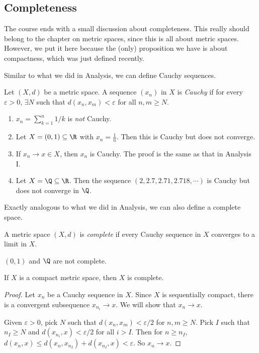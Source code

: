 \documentclass[a4paper]{article}
\begin{document}
\subsection{Completeness}
The course ends with a small discussion about completeness. This really should belong to the chapter on metric spaces, since this is all about metric spaces. However, we put it here because the (only) proposition we have is about compactness, which was just defined recently.

Similar to what we did in Analysis, we can define Cauchy sequences.
\begin{defi}
  Let $(X, d)$ be a metric space. A sequence $(x_n)$ in $X$ is \emph{Cauchy} if for every $\varepsilon > 0$, $\exists N$ such that $d(x_n, x_m) < \varepsilon$ for all $n, m \geq N$.
\end{defi}

\begin{eg}\leavevmode
  \begin{enumerate}
    \item $x_n = \sum_{k = 1}^n 1/k$ is \emph{not} Cauchy.
    \item Let $X = (0, 1) \subseteq \R$ with $x_n = \frac{1}{n}$. Then this is Cauchy but does not converge.
    \item If $x_n \to x\in X$, then $x_n$ is Cauchy. The proof is the same as that in Analysis I.

    \item Let $X = \Q \subseteq \R$. Then the sequence $(2, 2.7, 2.71, 2.718, \cdots)$ is Cauchy but does not converge in $\Q$.
  \end{enumerate}
\end{eg}

Exactly analogous to what we did in Analysis, we can also define a complete space.
\begin{defi}
  A metric space $(X, d)$ is \emph{complete} if every Cauchy sequence in $X$ converges to a limit in $X$.
\end{defi}

\begin{eg}
  $(0, 1)$ and $\Q$ are not complete.
\end{eg}

\begin{prop}
  If $X$ is a compact metric space, then $X$ is complete.
\end{prop}

\begin{proof}
  Let $x_n$ be a Cauchy sequence in $X$. Since $X$ is sequentially compact, there is a convergent subsequence $x_{n_i}\to x$. We will show that $x_n \to x$.

  Given $\varepsilon > 0$, pick $N$ such that $d(x_n, x_m) < \varepsilon/2$ for $n,m \geq N$. Pick $I$ such that $n_I \geq N$ and $d(x_{n_i}, x) < \varepsilon/2$ for all $i> I$. Then for $n \geq n_I$, $d(x_n, x) \leq d(x_n, x_{n_I}) + d(x_{n_I}, x) < \varepsilon$. So $x_n \to x$.
\end{proof}
\end{document}
